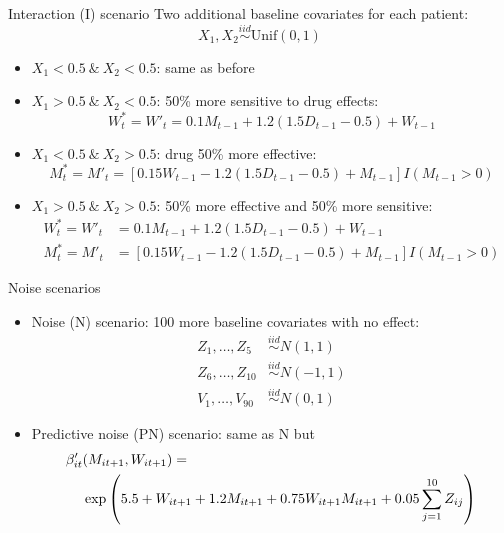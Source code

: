 \documentclass{beamer}
\begin{document}
\begin{frame}[c]{Interaction (I) scenario}
  Two additional baseline covariates for each patient:
  \begin{equation*}
    X_{1}, X_{2} \overset{iid}{\sim} \text{Unif}(0, 1)
  \end{equation*}
  
  \begin{itemize}[<+->]
    \item[] $X_{1} < 0.5 \ \& \ X_{2} < 0.5$: same as before
    \item[] $X_{1} > 0.5 \ \& \ X_{2} < 0.5$: 50\% more sensitive to drug effects:
  \begin{equation*}
  W^{*}_{t} = W'_{t} = 0.1 M_{t-1} + 1.2 (\mathbf{1.5} D_{t-1} - 0.5) + W_{t - 1}
  \end{equation*}
  \item[] $X_{1} < 0.5 \ \& \ X_{2} > 0.5$: drug 50\% more effective:
  \begin{equation*}
  M^{*}_{t} =  M'_{t} = [0.15 W_{t-1} - 1.2 (\mathbf{1.5} D_{t-1} - 0.5) + M_{t - 1}] I(M_{t-1} > 0)
  \end{equation*}
  \item[]   $X_{1} > 0.5 \ \& \ X_{2} > 0.5$: 50\% more effective and 50\% more sensitive:
  \begin{align*}
  W^{*}_{t} = W'_{t} &= 0.1 M_{t-1} + 1.2 (\mathbf{1.5} D_{t-1} - 0.5) + W_{t - 1} \\
  M^{*}_{t} = M'_{t} &= [0.15 W_{t-1} - 1.2 (\mathbf{1.5} D_{t-1} - 0.5) + M_{t - 1}] I(M_{t-1} > 0)
  \end{align*}
  \end{itemize}
\end{frame}

\begin{frame}[c]{Noise scenarios}
  \begin{itemize}
    \item Noise (N) scenario: 100 more baseline covariates with no effect:
  \begin{align*}
    Z_{1}, \ldots, Z_{5} &\overset{iid}{\sim} N(1, 1) \\
    Z_{6}, \ldots, Z_{10} &\overset{iid}{\sim} N(-1, 1) \\
    V_{1}, \ldots, V_{90} &\overset{iid}{\sim} N(0, 1)
  \end{align*}
  \item Predictive noise (PN) scenario: same as N but
  \begin{align*}
    \beta'_{it}&(M_{it+1}, W_{it+1}) = \\
    &\exp\del{5.5 + W_{it+1} + 1.2 M_{it+1} + 0.75 W_{it+1} M_{it+1} + 0.05 \sum_{j = 1}^{10} Z_{ij}}
  \end{align*}
  \end{itemize}
\end{frame}
\end{document}
